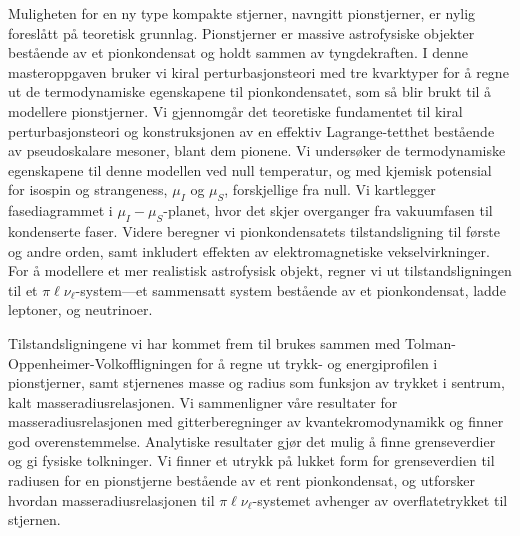 \vspace*{.5cm}
Muligheten for en ny type kompakte stjerner, navngitt pionstjerner, er nylig foreslått på teoretisk grunnlag.
Pionstjerner er massive astrofysiske objekter bestående av et pionkondensat og holdt sammen av tyngdekraften.
I denne masteroppgaven bruker vi kiral perturbasjonsteori med tre kvarktyper for å regne ut de termodynamiske egenskapene til pionkondensatet, som så blir brukt til å modellere pionstjerner.
Vi gjennomgår det teoretiske fundamentet til kiral perturbasjonsteori og konstruksjonen av en effektiv Lagrange-tetthet bestående av pseudoskalare mesoner, blant dem pionene.
Vi undersøker de termodynamiske egenskapene til denne modellen ved null temperatur, og med kjemisk potensial for isospin og strangeness, $\mu_I$ og $\mu_S$, forskjellige fra null.
Vi kartlegger fasediagrammet i $\mu_I-\mu_S$-planet, hvor det skjer overganger fra vakuumfasen til kondenserte faser.
Videre beregner vi pionkondensatets tilstandsligning til første og andre orden, samt inkludert effekten av elektromagnetiske vekselvirkninger.
For å modellere et mer realistisk astrofysisk objekt, regner vi ut tilstandsligningen til et $\pi\ell\nu_\ell$-system---et sammensatt system bestående av et pionkondensat, ladde leptoner, og neutrinoer.

Tilstandsligningene vi har kommet frem til brukes sammen med Tolman-Oppenheimer-Volkoffligningen for å regne ut trykk- og energiprofilen i pionstjerner, samt stjernenes masse og radius som funksjon av trykket i sentrum, kalt masseradiusrelasjonen.
Vi sammenligner våre resultater for masseradiusrelasjonen med gitterberegninger av kvantekromodynamikk og finner god overenstemmelse.
Analytiske resultater gjør det mulig å finne grenseverdier og gi fysiske tolkninger.
Vi finner et utrykk på lukket form for grenseverdien til radiusen for en pionstjerne bestående av et rent pionkondensat, og utforsker hvordan masseradiusrelasjonen til $\pi\ell\nu_\ell$-systemet avhenger av overflatetrykket til stjernen.
